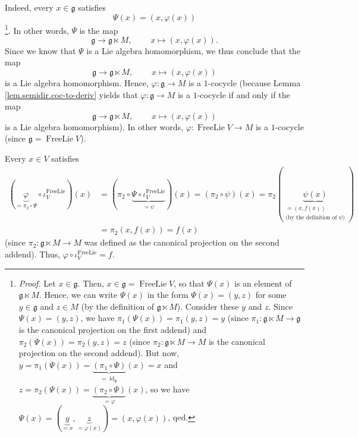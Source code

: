 \documentclass[etingof-lie.tex]{subfiles}
\begin{document}
\begin{verlong}
Indeed, every $x\in\mathfrak{g}$ satisfies%
\[
\Psi\left(  x\right)  =\left(  x,\varphi\left(  x\right)  \right)
\]
\footnote{\textit{Proof.} Let $x\in\mathfrak{g}$. Then, $x\in\mathfrak{g}%
=\operatorname*{FreeLie}V$, so that $\Psi\left(  x\right)  $ is an element of
$\mathfrak{g}\ltimes M$. Hence, we can write $\Psi\left(  x\right)  $ in the
form $\Psi\left(  x\right)  =\left(  y,z\right)  $ for some $y\in\mathfrak{g}$
and $z\in M$ (by the definition of $\mathfrak{g}\ltimes M$). Consider these
$y$ and $z$. Since $\Psi\left(  x\right)  =\left(  y,z\right)  $, we have
$\pi_{1}\left(  \Psi\left(  x\right)  \right)  =\pi_{1}\left(  y,z\right)  =y$
(since $\pi_{1}:\mathfrak{g}\ltimes M\rightarrow\mathfrak{g}$ is the canonical
projection on the first addend) and $\pi_{2}\left(  \Psi\left(  x\right)
\right)  =\pi_{2}\left(  y,z\right)  =z$ (since $\pi_{2}:\mathfrak{g}\ltimes
M\rightarrow M$ is the canonical projection on the second addend). But now,
$y=\pi_{1}\left(  \Psi\left(  x\right)  \right)  =\underbrace{\left(  \pi
_{1}\circ\Psi\right)  }_{=\operatorname*{id}\nolimits_{\mathfrak{g}}}\left(
x\right)  =x$ and $z=\pi_{2}\left(  \Psi\left(  x\right)  \right)
=\underbrace{\left(  \pi_{2}\circ\Psi\right)  }_{=\varphi}\left(  x\right)  $,
so we have $\Psi\left(  x\right)  =\left(  \underbrace{y}_{=x},\underbrace{z}%
_{=\varphi\left(  x\right)  }\right)  =\left(  x,\varphi\left(  x\right)
\right)  $, qed.}. In other words, $\Psi$ is the map
\[
\mathfrak{g}\rightarrow\mathfrak{g}\ltimes M,\ \ \ \ \ \ \ \ \ \ x\mapsto
\left(  x,\varphi\left(  x\right)  \right)  .
\]
Since we know that $\Psi$ is a Lie algebra homomorphism, we thus conclude that
the map
\[
\mathfrak{g}\rightarrow\mathfrak{g}\ltimes M,\ \ \ \ \ \ \ \ \ \ x\mapsto
\left(  x,\varphi\left(  x\right)  \right)
\]
is a Lie algebra homomorphism. Hence, $\varphi:\mathfrak{g}\rightarrow M$ is a
$1$-cocycle (because Lemma \ref{lem.semidir.coc-to-deriv} yields that
$\varphi:\mathfrak{g}\rightarrow M$ is a $1$-cocycle if and only if the map%
\[
\mathfrak{g}\rightarrow\mathfrak{g}\ltimes M,\ \ \ \ \ \ \ \ \ \ x\mapsto
\left(  x,\varphi\left(  x\right)  \right)
\]
is a Lie algebra homomorphism). In other words, $\varphi
:\operatorname*{FreeLie}V\rightarrow M$ is a $1$-cocycle (since $\mathfrak{g}%
=\operatorname*{FreeLie}V$).

Every $x\in V$ satisfies%
\begin{align*}
\left(  \underbrace{\varphi}_{=\pi_{2}\circ\Psi}\circ\iota_{V}%
^{\operatorname*{FreeLie}}\right)  \left(  x\right)   &  =\left(  \pi_{2}%
\circ\underbrace{\Psi\circ\iota_{V}^{\operatorname*{FreeLie}}}_{=\psi}\right)
\left(  x\right)  =\left(  \pi_{2}\circ\psi\right)  \left(  x\right)  =\pi
_{2}\left(  \underbrace{\psi\left(  x\right)  }_{\substack{=\left(  x,f\left(
x\right)  \right)  \\\text{(by the definition of }\psi\text{)}}}\right) \\
&  =\pi_{2}\left(  x,f\left(  x\right)  \right)  =f\left(  x\right)
\end{align*}
(since $\pi_{2}:\mathfrak{g}\ltimes M\rightarrow M$ was defined as the
canonical projection on the second addend). Thus, $\varphi\circ\iota
_{V}^{\operatorname*{FreeLie}}=f$.


\end{verlong}
\end{document}
